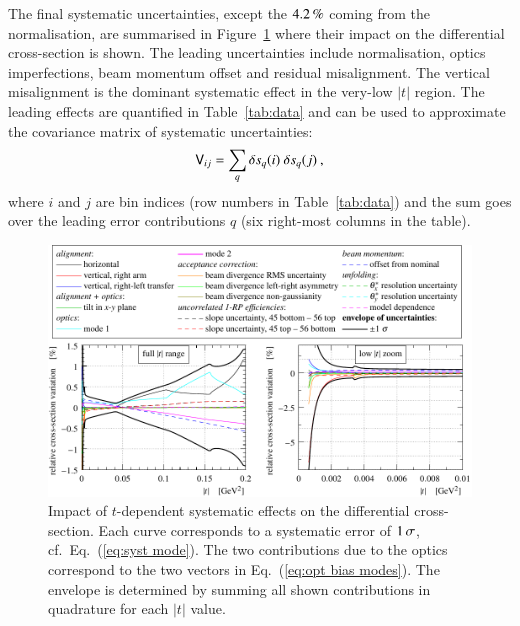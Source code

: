 The final systematic uncertainties, except the $4.2\,{\rm \%}$ coming from the normalisation, are summarised in Figure~\ref{fig:syst unc} where their impact on the differential cross-section is shown. The leading uncertainties include normalisation, optics imperfections, beam momentum offset and residual misalignment. The vertical misalignment is the dominant systematic effect in the very-low $|t|$ region. The leading effects are quantified in Table~\ref{tab:data} and can be used to approximate the covariance matrix of systematic uncertainties:
\begin{equation}
\label{eq:covar mat}
\mathsf{V}_{ij} = \sum_{q} \delta s_{q}(i)\ \delta s_{q}(j)\: ,
\end{equation}
where $i$ and $j$ are bin indices (row numbers in Table~\ref{tab:data}) and the sum goes over the leading error contributions $q$ (six right-most columns in the table).



\begin{figure}
\begin{center}
\includegraphics{fig/systematic_uncertainties.pdf}
\caption{%
Impact of $t$-dependent systematic effects on the differential cross-section. Each curve corresponds to a systematic error of $1\,{\rm \sigma}$, cf.~Eq.~(\ref{eq:syst mode}). The two contributions due to the optics correspond to the two vectors in Eq.~(\ref{eq:opt bias modes}). The envelope is determined by summing all shown contributions in quadrature for each $|t|$ value.
}
\label{fig:syst unc}
\end{center}
\end{figure}

